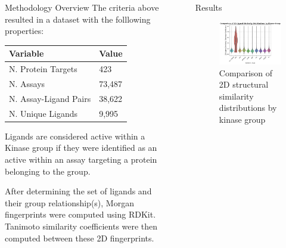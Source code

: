 \documentclass[final]{beamer}
\newlength{\sepwidth}
\newlength{\colwidth}
\newcommand{\separatorcolumn}{\begin{column}{\sepwidth}\end{column}}
\begin{document}
\begin{frame}[t]
\begin{columns}[t]
\begin{column}{\colwidth}
\begin{block}{Methodology Overview}
    The criteria above resulted in a dataset with the folllowing properties:

    \begin{table}[!ht]
    \centering
    \begin{tabular}{l|l}
        \hline
        \textbf{Variable} & \textbf{Value} \\ \hline
        N. Protein Targets & 423 \\ \hline
        N. Assays & 73,487 \\ \hline
        N. Assay-Ligand Pairs & 38,622 \\ \hline
        N. Unique Ligands & 9,995 \\ \hline
    \end{tabular}
    \end{table}

    Ligands are considered active within a Kinase group if they were identified as an active within an assay targeting a protein belonging to the group. 

    After determining the set of ligands and their group relationship(s), Morgan fingerprints were computed using RDKit. Tanimoto similarity coefficients were then computed between these 2D fingerprints. 

  \end{block}
\end{column}

\separatorcolumn

\begin{column}{\colwidth}

  \begin{block}{Results}

    \begin{figure}
        \centering
        \includegraphics[width=\textwidth]{figures/violin_plot.png}
        \caption{Comparison of 2D structural similarity distributions by kinase group}
        \label{violin_plot}
    \end{figure}
    

\end{block}
\end{column}
\end{columns}
\end{frame}
\end{document}

